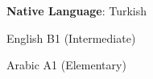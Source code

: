 \textbf{Native Language}: Turkish

\begin{cvskills}
  \cvskill
    {English} %
    {B1 (Intermediate)} %

  \cvskill
    {Arabic} %
    {A1 (Elementary)} %

\end{cvskills}
